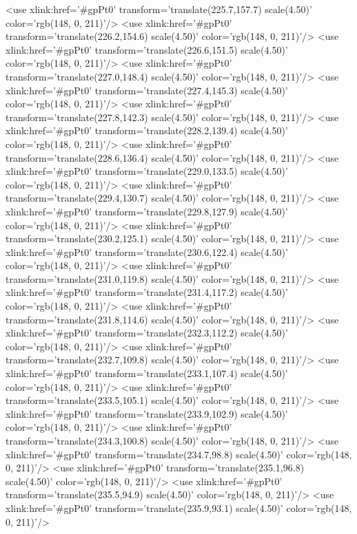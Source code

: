 	<use xlink:href='#gpPt0' transform='translate(225.7,157.7) scale(4.50)' color='rgb(148,   0, 211)'/>
	<use xlink:href='#gpPt0' transform='translate(226.2,154.6) scale(4.50)' color='rgb(148,   0, 211)'/>
	<use xlink:href='#gpPt0' transform='translate(226.6,151.5) scale(4.50)' color='rgb(148,   0, 211)'/>
	<use xlink:href='#gpPt0' transform='translate(227.0,148.4) scale(4.50)' color='rgb(148,   0, 211)'/>
	<use xlink:href='#gpPt0' transform='translate(227.4,145.3) scale(4.50)' color='rgb(148,   0, 211)'/>
	<use xlink:href='#gpPt0' transform='translate(227.8,142.3) scale(4.50)' color='rgb(148,   0, 211)'/>
	<use xlink:href='#gpPt0' transform='translate(228.2,139.4) scale(4.50)' color='rgb(148,   0, 211)'/>
	<use xlink:href='#gpPt0' transform='translate(228.6,136.4) scale(4.50)' color='rgb(148,   0, 211)'/>
	<use xlink:href='#gpPt0' transform='translate(229.0,133.5) scale(4.50)' color='rgb(148,   0, 211)'/>
	<use xlink:href='#gpPt0' transform='translate(229.4,130.7) scale(4.50)' color='rgb(148,   0, 211)'/>
	<use xlink:href='#gpPt0' transform='translate(229.8,127.9) scale(4.50)' color='rgb(148,   0, 211)'/>
	<use xlink:href='#gpPt0' transform='translate(230.2,125.1) scale(4.50)' color='rgb(148,   0, 211)'/>
	<use xlink:href='#gpPt0' transform='translate(230.6,122.4) scale(4.50)' color='rgb(148,   0, 211)'/>
	<use xlink:href='#gpPt0' transform='translate(231.0,119.8) scale(4.50)' color='rgb(148,   0, 211)'/>
	<use xlink:href='#gpPt0' transform='translate(231.4,117.2) scale(4.50)' color='rgb(148,   0, 211)'/>
	<use xlink:href='#gpPt0' transform='translate(231.8,114.6) scale(4.50)' color='rgb(148,   0, 211)'/>
	<use xlink:href='#gpPt0' transform='translate(232.3,112.2) scale(4.50)' color='rgb(148,   0, 211)'/>
	<use xlink:href='#gpPt0' transform='translate(232.7,109.8) scale(4.50)' color='rgb(148,   0, 211)'/>
	<use xlink:href='#gpPt0' transform='translate(233.1,107.4) scale(4.50)' color='rgb(148,   0, 211)'/>
	<use xlink:href='#gpPt0' transform='translate(233.5,105.1) scale(4.50)' color='rgb(148,   0, 211)'/>
	<use xlink:href='#gpPt0' transform='translate(233.9,102.9) scale(4.50)' color='rgb(148,   0, 211)'/>
	<use xlink:href='#gpPt0' transform='translate(234.3,100.8) scale(4.50)' color='rgb(148,   0, 211)'/>
	<use xlink:href='#gpPt0' transform='translate(234.7,98.8) scale(4.50)' color='rgb(148,   0, 211)'/>
	<use xlink:href='#gpPt0' transform='translate(235.1,96.8) scale(4.50)' color='rgb(148,   0, 211)'/>
	<use xlink:href='#gpPt0' transform='translate(235.5,94.9) scale(4.50)' color='rgb(148,   0, 211)'/>
	<use xlink:href='#gpPt0' transform='translate(235.9,93.1) scale(4.50)' color='rgb(148,   0, 211)'/>
